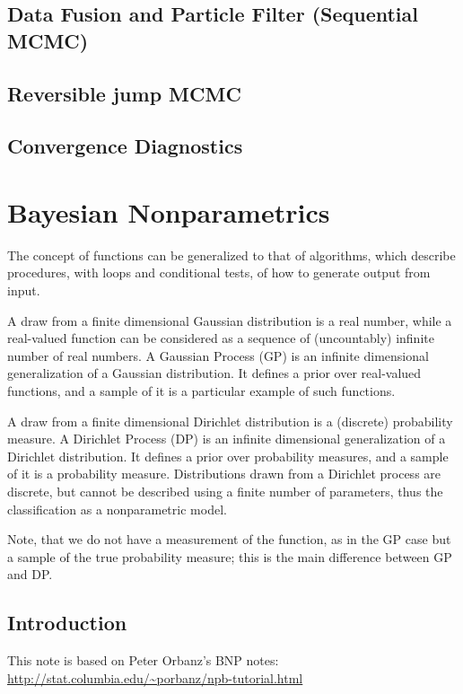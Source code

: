 \documentclass{book}
\begin{document}
\section{Data Fusion and Particle Filter (Sequential MCMC)}
\section{Reversible jump MCMC}
\section{Convergence Diagnostics}



\chapter{Bayesian Nonparametrics}
The concept of functions can be generalized to that of algorithms, which describe procedures, with loops and conditional tests, of how to generate output from input.

A draw from a finite dimensional Gaussian distribution is a real number, while a real-valued function can be considered as a sequence of (uncountably) infinite number of real numbers. A Gaussian Process (GP) is an infinite dimensional generalization of a Gaussian distribution. It defines a prior over real-valued functions, and a sample of it is a particular example of such functions.

A draw from a finite dimensional Dirichlet distribution is a (discrete) probability measure. A Dirichlet Process (DP) is an infinite dimensional generalization of a Dirichlet distribution. It defines a prior over probability measures, and a sample of it is a probability measure.  Distributions drawn from a Dirichlet process are discrete, but cannot be described using a finite number of parameters, thus the classification as a nonparametric model.


Note, that we do not have a measurement of the function, as in the GP case but a sample of the true probability measure; this is the main difference between GP and DP.

\section{Introduction}
This note is based on Peter Orbanz's BNP notes:
\vspace*{5mm}
\\
\url{http://stat.columbia.edu/~porbanz/npb-tutorial.html}
\end{document}
